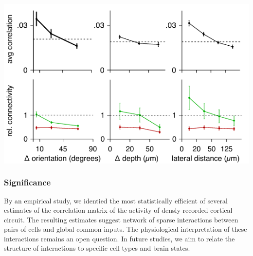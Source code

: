 \documentclass[12pt]{amsart}
\newenvironment{Figure}
  {\par\medskip\noindent\minipage{\linewidth}}
  {\endminipage\par\medskip}
\begin{document}
\begin{multicols}{2}
\begin{Figure}
  \centering
  \includegraphics{./Summary.pdf}
  \label{fig:summary}
\end{Figure}
\end{multicols}

\subsubsection*{Significance}
By an empirical study, we identied the most statistically efficient of several estimates of the correlation matrix of the activity of densly recorded cortical circuit. The resulting estimates suggest network of sparse interactions between pairs of cells and global common inputs. The physiological interpretation of these interactions remains an open question. In future studies, we aim to relate the structure of interactions to specific cell types and brain states.




\end{document}
